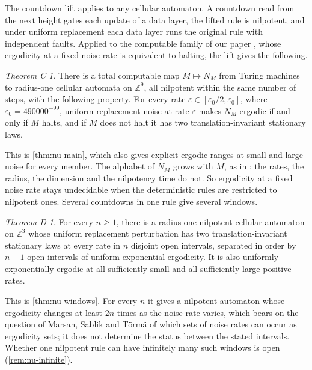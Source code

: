\documentclass[11pt]{article}
\theoremstyle{plain}
\theoremstyle{definition}
\theoremstyle{remark}
\newtheorem*{mainC}{Theorem C}
\newtheorem*{mainD}{Theorem D}
\newcommand{\Z}{\mathbb Z}
\newcommand{\eps}{\varepsilon}
\begin{document}
The countdown lift applies to any cellular automaton. A countdown read from the next height gates each update of a data layer, the lifted rule is nilpotent, and under uniform replacement each data layer runs the original rule with independent faults. Applied to the computable family of our paper \cite{DM26A}, whose ergodicity at a fixed noise rate is equivalent to halting, the lift gives the following.
\begin{mainC}
There is a total computable map $M\mapsto N_M$ from Turing machines to radius-one cellular automata on $\Z^9$, all nilpotent within the same number of steps, with the following property. For every rate $\eps\in[\eps_0/2,\eps_0]$, where $\eps_0=490000^{-99}$, uniform replacement noise at rate $\eps$ makes $N_M$ ergodic if and only if $M$ halts, and if $M$ does not halt it has two translation-invariant stationary laws.
\end{mainC}
This is \cref{thm:nu-main}, which also gives explicit ergodic ranges at small and large noise for every member. The alphabet of $N_M$ grows with $M$, as in \cite{DM26A}; the rates, the radius, the dimension and the nilpotency time do not. So ergodicity at a fixed noise rate stays undecidable when the deterministic rules are restricted to nilpotent ones. Several countdowns in one rule give several windows.
\begin{mainD}
For every $n\geq1$, there is a radius-one nilpotent cellular automaton on $\Z^3$ whose uniform replacement perturbation has two translation-invariant stationary laws at every rate in $n$ disjoint open intervals, separated in order by $n-1$ open intervals of uniform exponential ergodicity. It is also uniformly exponentially ergodic at all sufficiently small and all sufficiently large positive rates.
\end{mainD}
This is \cref{thm:nu-windows}. For every $n$ it gives a nilpotent automaton whose ergodicity changes at least $2n$ times as the noise rate varies, which bears on the question of Marsan, Sablik and T\"orm\"a \cite{MST26} of which sets of noise rates can occur as ergodicity sets; it does not determine the status between the stated intervals. Whether one nilpotent rule can have infinitely many such windows is open (\cref{rem:nu-infinite}).
\end{document}
